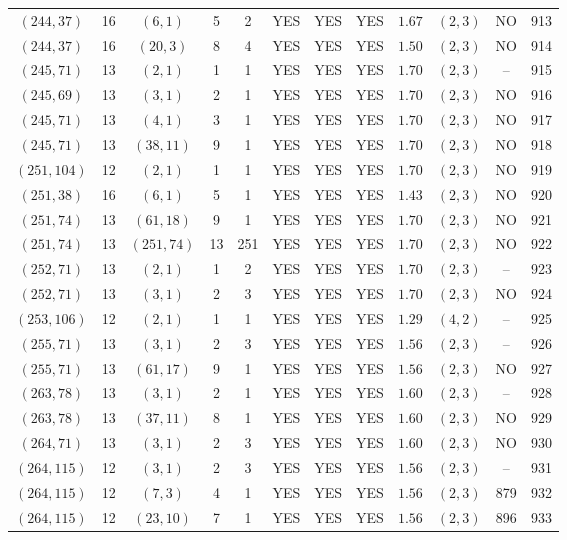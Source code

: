 \begin{longtable}{|c|c|c|c|c|c|c|c|c|c|c|c|}
$(244,37)$ & 16 & $(6,1)$ & 5 & 2 & YES & YES & YES & $1.67$ & $(2,3)$ & NO & 913\\
$(244,37)$ & 16 & $(20,3)$ & 8 & 4 & YES & YES & YES & $1.50$ & $(2,3)$ & NO & 914\\
$(245,71)$ & 13 & $(2,1)$ & 1 & 1 & YES & YES & YES & $1.70$ & $(2,3)$ & -- & 915\\
$(245,69)$ & 13 & $(3,1)$ & 2 & 1 & YES & YES & YES & $1.70$ & $(2,3)$ & NO & 916\\
$(245,71)$ & 13 & $(4,1)$ & 3 & 1 & YES & YES & YES & $1.70$ & $(2,3)$ & NO & 917\\
$(245,71)$ & 13 & $(38,11)$ & 9 & 1 & YES & YES & YES & $1.70$ & $(2,3)$ & NO & 918\\
$(251,104)$ & 12 & $(2,1)$ & 1 & 1 & YES & YES & YES & $1.70$ & $(2,3)$ & NO & 919\\
$(251,38)$ & 16 & $(6,1)$ & 5 & 1 & YES & YES & YES & $1.43$ & $(2,3)$ & NO & 920\\
$(251,74)$ & 13 & $(61,18)$ & 9 & 1 & YES & YES & YES & $1.70$ & $(2,3)$ & NO & 921\\
$(251,74)$ & 13 & $(251,74)$ & 13 & 251 & YES & YES & YES & $1.70$ & $(2,3)$ & NO & 922\\
$(252,71)$ & 13 & $(2,1)$ & 1 & 2 & YES & YES & YES & $1.70$ & $(2,3)$ & -- & 923\\
$(252,71)$ & 13 & $(3,1)$ & 2 & 3 & YES & YES & YES & $1.70$ & $(2,3)$ & NO & 924\\
$(253,106)$ & 12 & $(2,1)$ & 1 & 1 & YES & YES & YES & $1.29$ & $(4,2)$ & -- & 925\\
$(255,71)$ & 13 & $(3,1)$ & 2 & 3 & YES & YES & YES & $1.56$ & $(2,3)$ & -- & 926\\
$(255,71)$ & 13 & $(61,17)$ & 9 & 1 & YES & YES & YES & $1.56$ & $(2,3)$ & NO & 927\\
$(263,78)$ & 13 & $(3,1)$ & 2 & 1 & YES & YES & YES & $1.60$ & $(2,3)$ & -- & 928\\
$(263,78)$ & 13 & $(37,11)$ & 8 & 1 & YES & YES & YES & $1.60$ & $(2,3)$ & NO & 929\\
$(264,71)$ & 13 & $(3,1)$ & 2 & 3 & YES & YES & YES & $1.60$ & $(2,3)$ & NO & 930\\
$(264,115)$ & 12 & $(3,1)$ & 2 & 3 & YES & YES & YES & $1.56$ & $(2,3)$ & -- & 931\\
$(264,115)$ & 12 & $(7,3)$ & 4 & 1 & YES & YES & YES & $1.56$ & $(2,3)$ & 879 & 932\\
$(264,115)$ & 12 & $(23,10)$ & 7 & 1 & YES & YES & YES & $1.56$ & $(2,3)$ & 896 & 933\\

\end{longtable}
